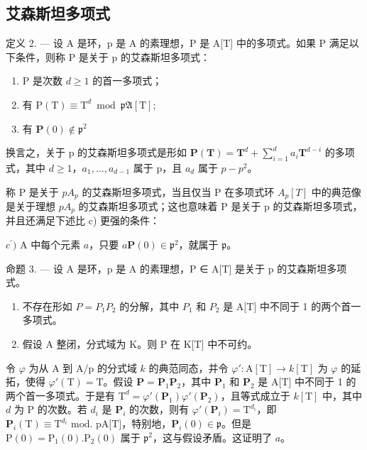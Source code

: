 \subsection{艾森斯坦多项式}

定义 2. --- 设 A 是环，p 是 A 的素理想，P 是 A{[}T{]} 中的多项式。如果 P 满足以下条件，则称 P 是关于 p 的艾森斯坦多项式：

\begin{enumerate}
\def\labelenumi{\alph{enumi})}
\item
  P 是次数 \(d \geqslant 1\) 的首一多项式；
\item
  有 \(\mathrm{P(T)}\equiv \mathrm{T}^d\bmod \mathfrak{pA}[\mathrm{T}];\)
\item
  有 \(\mathbf{P}(0)\notin \mathfrak{p}^2\)
\end{enumerate}

换言之，关于 p 的艾森斯坦多项式是形如 \(\mathbf{P}(\mathbf{T}) = \mathbf{T}^{d} + \sum_{i=1}^{d} a_{i} \mathbf{T}^{d-i}\) 的多项式，其中 \(d \geqslant 1\)，\(a_{1}, \ldots, a_{d-1}\) 属于 p，且 \(a_{d}\) 属于 \(p - p^{2}\)。

称 P 是关于 \(pA_{p}\) 的艾森斯坦多项式，当且仅当 P 在多项式环 \(A_{p}[T]\) 中的典范像是关于理想 \(pA_{p}\) 的艾森斯坦多项式；这也意味着 P 是关于 p 的艾森斯坦多项式，并且还满足下述比 c) 更强的条件：

\(c^{\prime})\) A 中每个元素 \(a\)，只要 \(a\mathbf{P}(0)\in\mathfrak{p}^{2}\)，就属于 \(\mathfrak{p}\)。

命题 3. --- 设 A 是环，p 是 A 的素理想，P ∈ A{[}T{]} 是关于 p 的艾森斯坦多项式。

\begin{enumerate}
\def\labelenumi{\alph{enumi})}
\item
  不存在形如 \(P = P_{1}P_{2}\) 的分解，其中 \(P_{1}\) 和 \(P_{2}\) 是 A{[}T{]} 中不同于 1 的两个首一多项式。
\item
  假设 A 整闭，分式域为 K。则 P 在 K[T] 中不可约。
\end{enumerate}

令 \(\varphi\) 为从 A 到 A/p 的分式域 \(k\) 的典范同态，并令 \(\varphi':\mathrm{A}[\mathrm{T}]\to k[\mathrm{T}]\) 为 \(\varphi\) 的延拓，使得 \(\varphi'(\mathrm{T})=\mathrm{T}\)。假设 \(\mathbf{P}=\mathbf{P}_{1}\mathbf{P}_{2}\)，其中 \(\mathbf{P}_{1}\) 和 \(\mathbf{P}_{2}\) 是 A{[}T{]} 中不同于 1 的两个首一多项式。于是有 \(\mathrm{T}^{d}=\varphi'(\mathbf{P}_{1})\varphi'(\mathbf{P}_{2})\)，且等式成立于 \(k[\mathrm{T}]\) 中，其中 \(d\) 为 P 的次数。若 \(d_{i}\) 是 \(\mathbf{P}_{i}\) 的次数，则有 \(\varphi'(\mathbf{P}_{i})=\mathrm{T}^{d_{i}}\)，即 \(\mathbf{P}_{i}(\mathrm{T})\equiv\mathrm{T}^{d_{i}}\text{ mod. pA[T]}\)，特别地，\(\mathbf{P}_{i}(0)\in\mathfrak{p}\)。但是 \(\mathrm{P}(0)=\mathrm{P}_{1}(0).\mathrm{P}_{2}(0)\) 属于 \(\mathfrak{p}^{2}\)，这与假设矛盾。这证明了 \(a\)。

